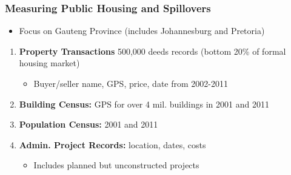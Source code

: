 \documentclass[aspectratio=149]{beamer}
\begin{document}



\begin{frame}
\frametitle{Measuring Public Housing and Spillovers}

\begin{itemize}
  \item Focus on Gauteng Province (includes Johannesburg and Pretoria)
\end{itemize}

\begin{enumerate}
\item \textbf{Property Transactions} 500,000 deeds records (bottom 20\% of formal housing market)
  \begin{itemize}
    \item Buyer/seller name, GPS, price, date from 2002-2011
  \end{itemize}
\vspace{.1cm}
\item \textbf{Building Census:} GPS for over 4 mil. buildings in 2001 and 2011
\vspace{.1cm}
\item \textbf{Population Census:} 2001 and 2011
\vspace{.1cm}
\item \textbf{Admin. Project Records:} location, dates, costs
  \begin{itemize}
    \item Includes planned but unconstructed projects
  \end{itemize}
\end{enumerate}
\end{frame}

\end{document}
